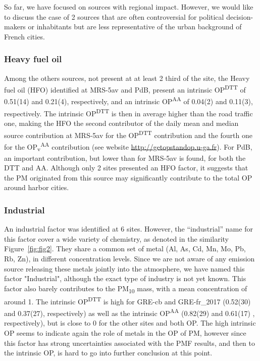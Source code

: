 \documentclass[acp]{copernicus}
\begin{document}
So far, we have focused on sources with regional impact. However, we
would like to discuss the case of 2 sources that are often controversial
for political decision-makers or inhabitants but are less representative
of the urban background of French cities.

\subsubsection{Heavy fuel oil}%
\label{heavy-fuel-oil}

Among the others sources, not present at at least 2 third of the site,
the Heavy fuel oil (HFO) identified at MRS-5av and PdB, present an
intrinsic OP\textsuperscript{DTT} of 0.51(14) and 0.21(4), respectively,
and an intrinsic OP\textsuperscript{AA} of 0.04(2) and 0.11(3),
respectively. The intrinsic OP\textsuperscript{DTT} is then in average
higher than the road traffic one, making the HFO the second contributor
of the daily mean and median source contribution at MRS-5av for the
OP\textsuperscript{DTT} contribution and the fourth one for the
OP\textsubscript{v}\textsuperscript{AA} contribution (see website
\url{http://getopstandop.u-ga.fr}). For PdB, an important contribution, but
lower than for MRS-5av is found, for both the DTT and AA. Although only
2 sites presented an HFO factor, it suggests that the PM originated from
this source may significantly contribute to the total OP around harbor
cities.

\subsubsection{Industrial}%
\label{industrial}

An industrial factor was identified at 6 sites. However, the
``industrial'' name for this factor cover a wide variety of chemistry,
as denoted in the similarity
Figure~\ref{fig:fig2}. They share a common
set of metal (Al, As, Cd, Mn, Mo, Pb, Rb, Zn), in different
concentration levels. Since we are not aware of any emission source
releasing these metals jointly into the atmosphere, we have named this
factor "Industrial", although the exact type of industry is not yet
known. This factor also barely contributes to the PM\textsubscript{10}
mass, with a mean concentration of around 1. The intrinsic
OP\textsuperscript{DTT} is high for GRE-cb and GRE-fr\_2017 (0.52(30)
and 0.37(27), respectively) as well as the intrinsic
OP\textsuperscript{AA} (0.82(29) and 0.61(17) , respectively), but is
close to 0 for the other sites and both OP. The high intrinsic OP seems
to indicate again the role of metals in the OP of PM, however since this
factor has strong uncertainties associated with the PMF results, and
then to the intrinsic OP, is hard to go into further conclusion at this
point.
\end{document}
